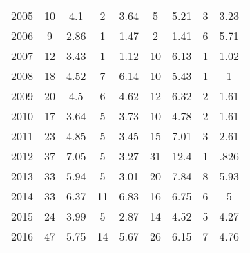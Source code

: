 \begin{table}[htbp]
\begin{tabular}{l*{8}{c}}
2005      &       10&      4.1&        2&     3.64&        5&     5.21&        3&     3.23\\
2006      &        9&     2.86&        1&     1.47&        2&     1.41&        6&     5.71\\
2007      &       12&     3.43&        1&     1.12&       10&     6.13&        1&     1.02\\
2008      &       18&     4.52&        7&     6.14&       10&     5.43&        1&        1\\
2009      &       20&      4.5&        6&     4.62&       12&     6.32&        2&     1.61\\
2010      &       17&     3.64&        5&     3.73&       10&     4.78&        2&     1.61\\
2011      &       23&     4.85&        5&     3.45&       15&     7.01&        3&     2.61\\
2012      &       37&     7.05&        5&     3.27&       31&     12.4&        1&     .826\\
2013      &       33&     5.94&        5&     3.01&       20&     7.84&        8&     5.93\\
2014      &       33&     6.37&       11&     6.83&       16&     6.75&        6&        5\\
2015      &       24&     3.99&        5&     2.87&       14&     4.52&        5&     4.27\\
2016      &       47&     5.75&       14&     5.67&       26&     6.15&        7&     4.76\\
\hline\hline
\end{tabular}
\end{table}
